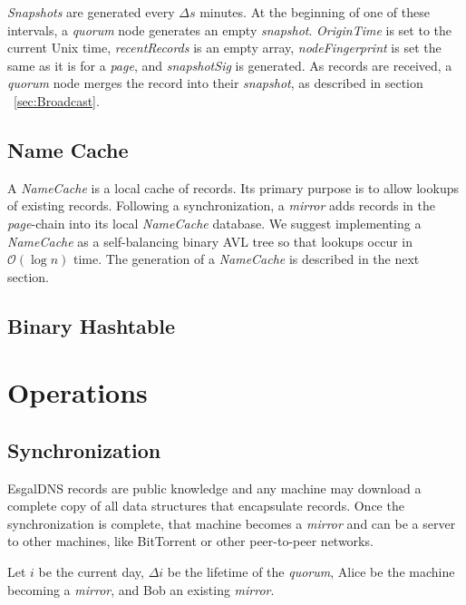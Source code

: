 \emph{Snapshots} are generated every $ \Delta s $ minutes. At the beginning of one of these intervals, a \emph{quorum} node generates an empty \emph{snapshot}. \emph{OriginTime} is set to the current Unix time, \emph{recentRecords} is an empty array, \emph{nodeFingerprint} is set the same as it is for a \emph{page}, and \emph{snapshotSig} is generated. As records are received, a \emph{quorum} node merges the record into their \emph{snapshot}, as described in section ~\ref{sec:Broadcast}.

\subsection{Name Cache}
\label{sec:NameCache}

A \emph{NameCache} is a local cache of records. Its primary purpose is to allow lookups of existing records. Following a synchronization, a \emph{mirror} adds records in the \emph{page}-chain into its local \emph{NameCache} database. We suggest implementing a \emph{NameCache} as a self-balancing binary AVL tree so that lookups occur in $ \mathcal{O}(\log{}n) $ time. The generation of a \emph{NameCache} is described in the next section.


\subsection{Binary Hashtable}
\label{sec:BinaryHashtable}

\section{Operations}

\subsection{Synchronization}
\label{sec:Synchronization}

EsgalDNS records are public knowledge and any machine may download a complete copy of all data structures that encapsulate records. Once the synchronization is complete, that machine becomes a \emph{mirror} and can be a server to other machines, like BitTorrent or other peer-to-peer networks.

Let $ i $ be the current day, $ \Delta i $ be the lifetime of the \emph{quorum}, Alice be the machine becoming a \emph{mirror}, and Bob an existing \emph{mirror}. 


